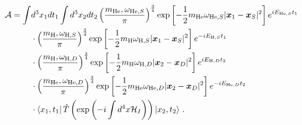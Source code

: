 \documentclass[10pt]{article}
\begin{document}
\begin{align*}
  \mathcal{A} = \int & d^{3}x_{1}dt_{1}\int d^{3}x_{2}dt_{2} \left(\frac{m_{\text{He}},\omega_{\text{He},S}}{\pi}\right)^{\frac{3}{4}}\exp\left[-\frac{1}{2}m_{\text{He}}\omega_{\text{He},S}|\bm{x}_{1} - \bm{x}_{S}|^{2}\right]e^{iE_{\text{He},S}t_{1}}\\
  & \cdot \left(\frac{m_{\text{H}},\omega_{\text{H},S}}{\pi}\right)^{\frac{3}{4}}\exp\left[-\frac{1}{2}m_{\text{H}}\omega_{\text{H},S}|\bm{x}_{1} - \bm{x}_{S}|^{2}\right]e^{-iE_{\text{H},S}t_{1}} \\
  & \cdot \left(\frac{m_{\text{H}},\omega_{\text{H},D}}{\pi}\right)^{\frac{3}{4}}\exp\left[-\frac{1}{2}m_{\text{H}}\omega_{\text{H},D}|\bm{x}_{2} - \bm{x}_{D}|^{2}\right]e^{iE_{\text{H},D}t_{2}}\\
  & \cdot \left(\frac{m_{\text{He}},\omega_{\text{He},D}}{\pi}\right)^{\frac{3}{4}}\exp\left[-\frac{1}{2}m_{\text{He}}\omega_{\text{He},D}|\bm{x}_{2} - \bm{x}_{D}|^{2}\right]e^{-iE_{\text{He},D}t_{2}}\\
  & \cdot \bra{x_{1}, t_{1}}\hat{T}\left(\exp\left(-i\int d^{4}x\mathcal{H}_{I}\right)\right)\ket{x_{2},t_{2}} \, .
\end{align*}
\end{document}
